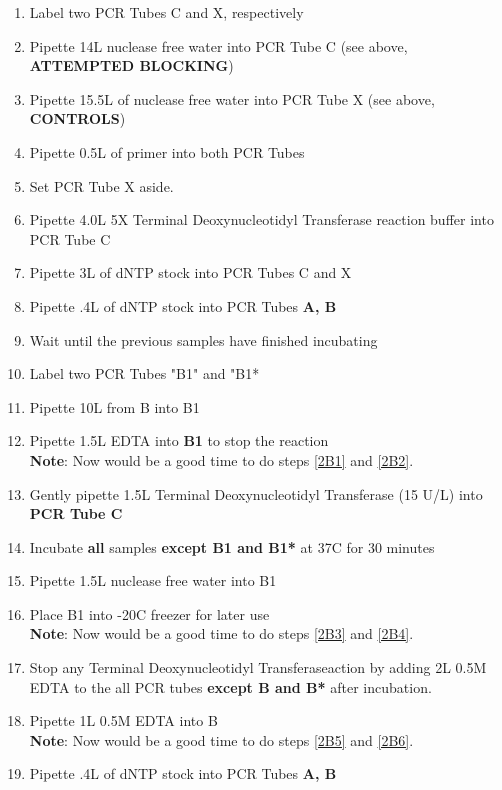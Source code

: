 \documentclass[letterpaper]{article}
\newcommand{\tdt}{Terminal Deoxynucleotidyl Transferase}
\newcommand{\C}{\degree{}C}
\newcommand{\uL}{\micro{}L}
\begin{document}
\begin{enumerate}
\subsection{Extending}
Based off of our standard \tdt{} extending procedure \cite{genTdT}.
\item{Label two PCR Tubes C and X, respectively}
\item{Pipette 14\uL{} nuclease free water into PCR Tube C (see above, \textbf{ATTEMPTED BLOCKING})}
\item{Pipette 15.5\uL{} of nuclease free water into PCR Tube X (see above, \textbf{CONTROLS})}
\item{Pipette 0.5\uL{} of primer into both PCR Tubes}
\item{Set PCR Tube X aside.}
\item{Pipette 4.0\uL{} 5X \tdt{} reaction buffer into PCR Tube C}
\item{Pipette 3\uL{} of dNTP stock into PCR Tubes C and X}
\item{Pipette .4\uL{} of dNTP stock into PCR Tubes \textbf{A, B}}
\item{Wait until the previous samples have finished incubating}
\item{Label two PCR Tubes "B1" and "B1*}
\item{Pipette 10\uL{} from B into B1}
\item{Pipette 1.5\uL{} EDTA into \textbf{B1} to stop the reaction \cite{Invitrogen2002}}\\
	\textbf{Note}: Now would be a good time to do steps \ref{2B1} and \ref{2B2}.
\item{Gently pipette 1.5\uL{} \tdt{} (15 U/\uL{}) into \textbf{PCR Tube C}}
\item{Incubate \textbf{all} samples \textbf{except B1 and B1*} at 37\C{} for 30 minutes}
\item{Pipette 1.5\uL{} nuclease free water into B1}
\item{Place B1 into -20\C{} freezer for later use}\\
	\textbf{Note}: Now would be a good time to do steps \ref{2B3} and \ref{2B4}.
\item{Stop any \tdt action by adding 2\uL{} 0.5M EDTA to the all PCR tubes \textbf{except B and B*} after incubation.\cite{Invitrogen2002}}
\item{Pipette 1\uL{} 0.5M EDTA into B}\\
\textbf{Note}: Now would be a good time to do steps \ref{2B5} and \ref{2B6}.
\item{Pipette .4\uL{} of dNTP stock into PCR Tubes \textbf{A, B}}


\end{enumerate}
\end{document}
